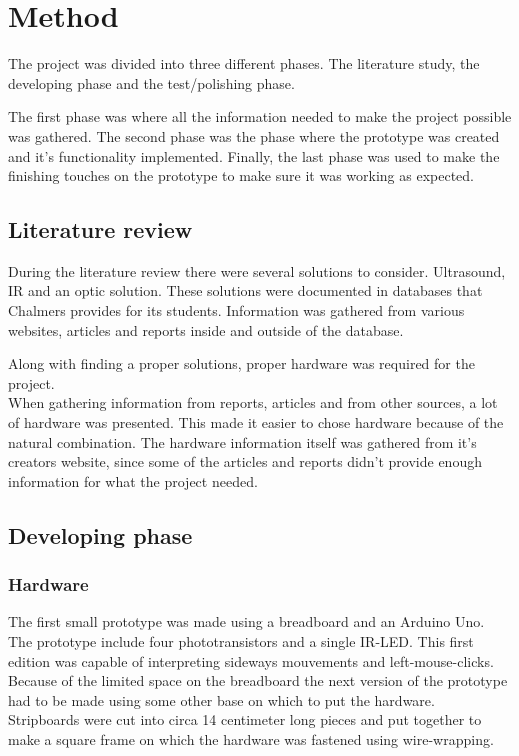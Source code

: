 \chapter{Method}
The project was divided into three different phases. The literature study, the developing phase and the test/polishing phase.

The first phase was where all the information needed to make the project possible was gathered.
The second phase was the phase where the prototype was created and it's functionality implemented.
Finally, the last phase was used to make the finishing touches on the prototype to make sure it
was working as expected.

\section{Literature review}
During the literature review there were several solutions to consider. Ultrasound, IR and an optic
solution. These solutions were documented in databases that Chalmers provides for its students.
Information was gathered from various websites, articles and reports inside and outside of the
database.

Along with finding a proper solutions, proper hardware was required for the project.\\
When gathering information from reports, articles and from other sources, a lot of hardware was
presented. This made it easier to chose hardware because of the natural combination. The hardware
information itself was gathered from it's creators website, since some of the articles and reports
didn't provide enough information for what the project needed.

\section{Developing phase}
\subsection{Hardware}
The first small prototype was made using a breadboard and an Arduino Uno. The prototype
include four phototransistors and a single IR-LED. This first edition was capable of interpreting
sideways mouvements and left-mouse-clicks. Because of the limited space on the breadboard
the next version of the prototype had to be made using some other base on which to put the 
hardware.\\
Stripboards were cut into circa 14 centimeter long pieces and put together to make a square
frame on which the hardware was fastened using wire-wrapping.

